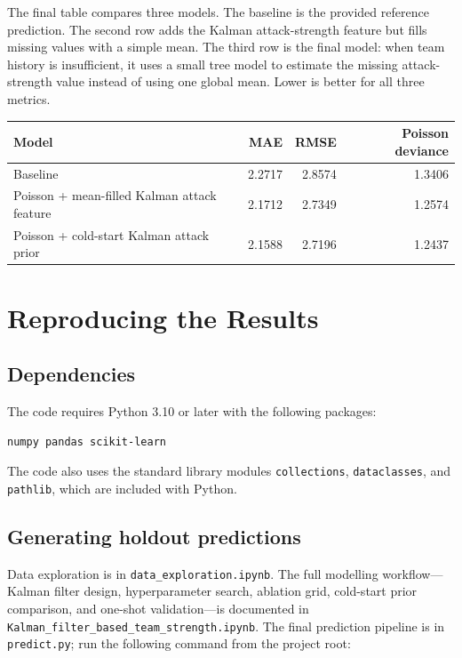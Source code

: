\documentclass[11pt]{article}
\begin{document}
The final table compares three models. The baseline is the provided reference
prediction. The second row adds the Kalman attack-strength feature but fills
missing values with a simple mean. The third row is the final model: when team
history is insufficient, it uses a small tree model to estimate the missing
attack-strength value instead of using one global mean. Lower is better for all
three metrics.

\begin{table}[h]
\centering
\begin{tabular}{lrrr}
\toprule
Model & MAE & RMSE & Poisson deviance \\
\midrule
Baseline & 2.2717 & 2.8574 & 1.3406 \\
Poisson + mean-filled Kalman attack feature & 2.1712 & 2.7349 & 1.2574 \\
Poisson + cold-start Kalman attack prior & 2.1588 & 2.7196 & 1.2437 \\
\bottomrule
\end{tabular}
\end{table}

\section{Reproducing the Results}

\subsection{Dependencies}

The code requires Python 3.10 or later with the following packages:

\begin{verbatim}
numpy pandas scikit-learn
\end{verbatim}

The code also uses the standard library modules \texttt{collections},
\texttt{dataclasses}, and \texttt{pathlib}, which are included with Python.


\subsection{Generating holdout predictions}

Data exploration is in \texttt{data\_exploration.ipynb}.
The full modelling workflow---Kalman filter design, hyperparameter search,
ablation grid, cold-start prior comparison, and one-shot validation---is
documented in
\texttt{Kalman\_filter\_based\_team\_strength.ipynb}.
The final prediction pipeline is in \texttt{predict.py}; run the following command from the project root:
\end{document}
